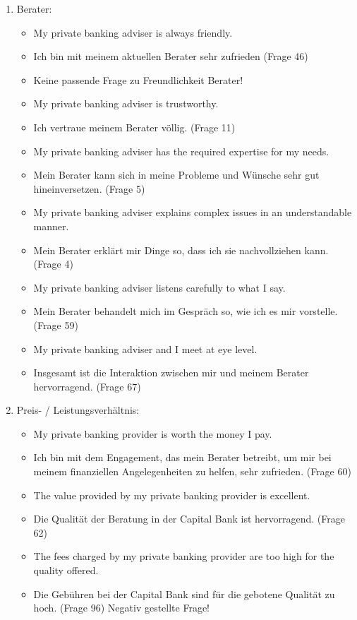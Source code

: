 \documentclass{article}\usepackage[]{graphicx}\usepackage[]{color}
\begin{document}
\begin{enumerate}
    
    \item Berater:
    \begin{itemize}
        \item My private banking adviser is always friendly.
        \item Ich bin mit meinem aktuellen Berater sehr zufrieden (Frage 46)
        \item Keine passende Frage zu Freundlichkeit Berater!
        \item My private banking adviser is trustworthy.
        \item Ich vertraue meinem Berater völlig. (Frage 11)
        \item My private banking adviser has the required expertise for my needs.
        \item Mein Berater kann sich in meine Probleme und Wünsche sehr gut hineinversetzen. (Frage 5)
        \item My private banking adviser explains complex issues in an understandable manner.
        \item Mein Berater erklärt mir Dinge so, dass ich sie nachvollziehen kann. (Frage 4)
        \item My private banking adviser listens carefully to what I say.
        \item Mein Berater behandelt mich im Gespräch so, wie ich es mir vorstelle. (Frage 59)
        \item My private banking adviser and I meet at eye level.
        \item Insgesamt ist die Interaktion zwischen mir und meinem Berater hervorragend. (Frage 67)
    \end{itemize}

    
    \item Preis- / Leistungsverhältnis:
    \begin{itemize}
        \item My private banking provider is worth the money I pay.
        \item Ich bin mit dem Engagement, das mein Berater betreibt, um mir bei meinem finanziellen Angelegenheiten zu helfen, sehr zufrieden. (Frage 60)
        \item The value provided by my private banking provider is excellent.
        \item Die Qualität der Beratung in der Capital Bank ist hervorragend. (Frage 62)
        \item The fees charged by my private banking provider are too high for the quality offered.
        \item Die Gebühren bei der Capital Bank sind für die gebotene Qualität zu hoch. (Frage 96) Negativ gestellte Frage!
    \end{itemize}


\end{enumerate}
\end{document}
